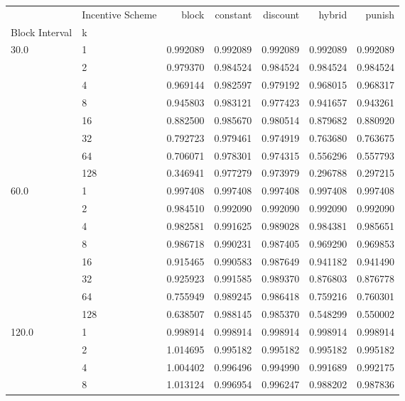 \begin{tabular}{llrrrrr}
\toprule
      & Incentive Scheme &     block &  constant &  discount &    hybrid &    punish \\
Block Interval & k &           &           &           &           &           \\
\midrule
30.0  & 1   &  0.992089 &  0.992089 &  0.992089 &  0.992089 &  0.992089 \\
      & 2   &  0.979370 &  0.984524 &  0.984524 &  0.984524 &  0.984524 \\
      & 4   &  0.969144 &  0.982597 &  0.979192 &  0.968015 &  0.968317 \\
      & 8   &  0.945803 &  0.983121 &  0.977423 &  0.941657 &  0.943261 \\
      & 16  &  0.882500 &  0.985670 &  0.980514 &  0.879682 &  0.880920 \\
      & 32  &  0.792723 &  0.979461 &  0.974919 &  0.763680 &  0.763675 \\
      & 64  &  0.706071 &  0.978301 &  0.974315 &  0.556296 &  0.557793 \\
      & 128 &  0.346941 &  0.977279 &  0.973979 &  0.296788 &  0.297215 \\
60.0  & 1   &  0.997408 &  0.997408 &  0.997408 &  0.997408 &  0.997408 \\
      & 2   &  0.984510 &  0.992090 &  0.992090 &  0.992090 &  0.992090 \\
      & 4   &  0.982581 &  0.991625 &  0.989028 &  0.984381 &  0.985651 \\
      & 8   &  0.986718 &  0.990231 &  0.987405 &  0.969290 &  0.969853 \\
      & 16  &  0.915465 &  0.990583 &  0.987649 &  0.941182 &  0.941490 \\
      & 32  &  0.925923 &  0.991585 &  0.989370 &  0.876803 &  0.876778 \\
      & 64  &  0.755949 &  0.989245 &  0.986418 &  0.759216 &  0.760301 \\
      & 128 &  0.638507 &  0.988145 &  0.985370 &  0.548299 &  0.550002 \\
120.0 & 1   &  0.998914 &  0.998914 &  0.998914 &  0.998914 &  0.998914 \\
      & 2   &  1.014695 &  0.995182 &  0.995182 &  0.995182 &  0.995182 \\
      & 4   &  1.004402 &  0.996496 &  0.994990 &  0.991689 &  0.992175 \\
      & 8   &  1.013124 &  0.996954 &  0.996247 &  0.988202 &  0.987836 \\

\end{tabular}
